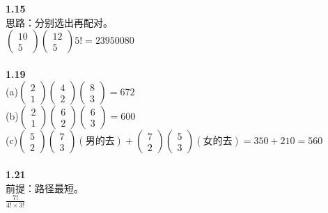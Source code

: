 \documentclass{book}%
\begin{document}
	{\bfseries 1.15}\\
	思路：分别选出再配对。\\
	$\begin{pmatrix}
		10\\5
	\end{pmatrix}\begin{pmatrix}
		12\\5
	\end{pmatrix}5!=23950080$ \\ 
	~\\
	
	{\bfseries 1.19}\\
	(a)$\begin{pmatrix}
		2\\1
	\end{pmatrix}\begin{pmatrix}
		4\\2
	\end{pmatrix}\begin{pmatrix}
		8\\3
	\end{pmatrix}=672$\\
	(b)$\begin{pmatrix}
		2\\1
	\end{pmatrix}\begin{pmatrix}
		6\\2
	\end{pmatrix}\begin{pmatrix}
		6\\3
	\end{pmatrix}=600$\\
	(c)$\begin{pmatrix}
		5\\2
	\end{pmatrix}\begin{pmatrix}
		7\\3
	\end{pmatrix}(\text{男的去})+\begin{pmatrix}
		7\\2
	\end{pmatrix}\begin{pmatrix}
		5\\3
	\end{pmatrix}(\text{女的去})=350+210=560$\\
	~\\
	
	{\bfseries 1.21}\\
	前提：路径最短。\\
	$\frac{7!}{4!\times 3!}$\\
	~\\
	
\end{document}

